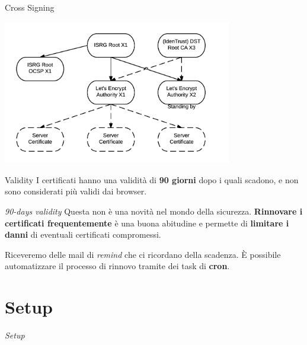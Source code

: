 \documentclass[xcolor=svgnames,11pt]{beamer}
\begin{document}
\begin{frame}{Cross Signing}
\begin{center}
\includegraphics[width=10cm]{img/certs.png}
\end{center}
\end{frame}

\begin{frame}{Validity}
I certificati hanno una validità di \textbf{90 giorni} dopo i quali scadono, e non sono
considerati più validi dai browser.

\medskip\pause

\begin{block}{\emph{90-days validity}}
Questa non è una novità nel mondo della sicurezza. \textbf{Rinnovare i certificati frequentemente}
è una buona abitudine e permette di \textbf{limitare i danni} di eventuali certificati compromessi.
\end{block}

\medskip\pause
Riceveremo delle mail di \emph{remind} che ci ricordano della scadenza.
È possibile automatizzare il processo di rinnovo tramite dei task di \textbf{cron}.
\end{frame}


\section{Setup}
\begin{frame}{}
\begin{center}
\begin{Huge}
\textcolor{leorange}{\emph{Setup}}
\end{Huge}
\end{center}
\end{frame}
\end{document}
